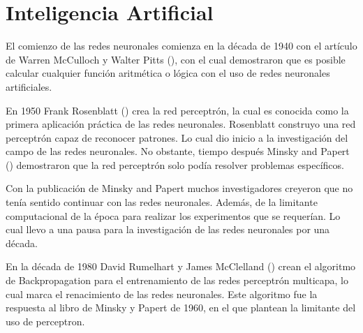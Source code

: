\section{Inteligencia Artificial}


El comienzo de las redes neuronales comienza en la década de 1940 con el artículo de Warren McCulloch y Walter Pitts (\cite{mcculloch1943Logical}), con el cual demostraron que es posible calcular cualquier función aritmética o lógica con el uso de redes neuronales artificiales.

En 1950 Frank Rosenblatt (\cite{rosenblatt1958Perceptron}) crea la red perceptrón, la cual es conocida como la primera aplicación práctica de las redes neuronales. Rosenblatt construyo una red perceptrón capaz de reconocer patrones. Lo cual dio inicio a la investigación del campo de las redes neuronales. No obstante, tiempo después Minsky and Papert (\cite{minsky1969Perceptrons}) demostraron que la red perceptrón solo podía resolver problemas específicos.

Con la publicación de Minsky and Papert muchos investigadores creyeron que no tenía sentido continuar con las redes neuronales. Además, de la limitante computacional de la época para realizar los experimentos que se requerían. Lo cual llevo a una pausa para la investigación de las redes neuronales por una década.

En la década de 1980 David Rumelhart y James McClelland (\cite{rumelhart1986Parallel}) crean el algoritmo de Backpropagation para el entrenamiento de las redes perceptrón multicapa, lo cual marca el renacimiento de las redes neuronales. Este algoritmo fue la respuesta al libro de Minsky y Papert de 1960, en el que plantean la limitante del uso de perceptron.
